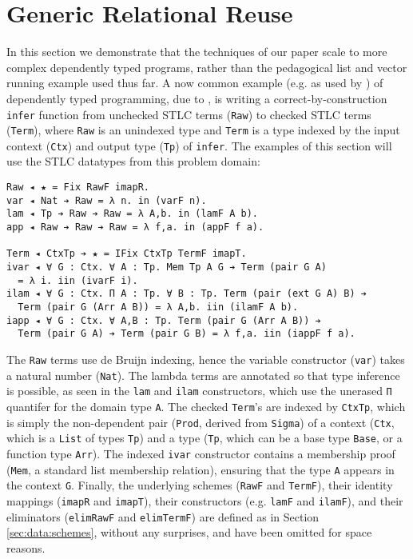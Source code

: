 \documentclass[acmsmall,screen]{acmart}
\newcommand{\refsec}[1]{Section \ref{sec:#1}}
\newcommand{\labsec}[1]{\label{sec:#1}}
\begin{document}
\section{Generic Relational Reuse}
\labsec{rel}

In this section we demonstrate that the techniques of our paper scale
to more complex dependently typed programs, rather than
the pedagogical list and vector running example used thus far. A now
common example (e.g. as used by \citet{tutorial:agda}) of
dependently typed programming, due to \citet{viewfromleft}, is writing
a correct-by-construction \verb;infer; function from unchecked STLC
terms (\verb;Raw;) to checked STLC terms (\verb;Term;), where
\verb;Raw; is an unindexed type and \verb;Term; is a type indexed by
the input context (\verb;Ctx;) and output type (\verb;Tp;) of
\verb;infer;. The examples of this section will use the STLC datatypes
from this problem domain:
\begin{verbatim}
Raw ◂ ★ = Fix RawF imapR.
var ◂ Nat ➔ Raw = λ n. in (varF n).
lam ◂ Tp ➔ Raw ➔ Raw = λ A,b. in (lamF A b).
app ◂ Raw ➔ Raw ➔ Raw = λ f,a. in (appF f a).

Term ◂ CtxTp ➔ ★ = IFix CtxTp TermF imapT.
ivar ◂ ∀ G : Ctx. ∀ A : Tp. Mem Tp A G ➔ Term (pair G A)
  = λ i. iin (ivarF i).
ilam ◂ ∀ G : Ctx. Π A : Tp. ∀ B : Tp. Term (pair (ext G A) B) ➔
  Term (pair G (Arr A B)) = λ A,b. iin (ilamF A b).
iapp ◂ ∀ G : Ctx. ∀ A,B : Tp. Term (pair G (Arr A B)) ➔
  Term (pair G A) ➔ Term (pair G B) = λ f,a. iin (iappF f a).
\end{verbatim}
The \verb;Raw; terms use de Bruijn indexing, hence the variable
constructor (\verb;var;) takes a natural number (\verb;Nat;). The
lambda terms are annotated so that type inference is possible, as seen
in the \verb;lam; and \verb;ilam; constructors, which use the unerased
\verb;Π; quantifer for the domain type \verb;A;. The checked
\verb;Term;'s are indexed by \verb;CtxTp;, which is simply the
non-dependent pair (\verb;Prod;, derived from \verb;Sigma;) of a
context (\verb;Ctx;, which is a \verb;List; of types \verb;Tp;) and a
type (\verb;Tp;, which can be a base type \verb;Base;, or a function
type \verb;Arr;). The indexed \verb;ivar; constructor contains a
membership proof (\verb;Mem;, a standard list membership relation),
ensuring that the type \verb;A; appears in the context
\verb;G;. Finally, the underlying schemes (\verb;RawF; and
\verb;TermF;), their identity mappings (\verb;imapR; and
\verb;imapT;), their constructors (e.g. \verb;lamF; and \verb;ilamF;),
and their eliminators (\verb;elimRawF; and \verb;elimTermF;) are
defined as in \refsec{data:schemes}, without any surprises, and have
been omitted for space reasons.
\end{document}
